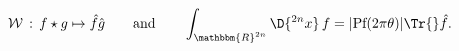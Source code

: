 \begin{equation}
 \mathcal{W}\,:\,f\star g\mapsto \hat{f}\hat{g}\qquad\text{and}\qquad
 \int_{\mathbbm{R}^{2n}}\D{ ^{2n}x}\,f=|\text{Pf}(2\pi\theta)|\Tr{}\hat{f}.
\end{equation}

